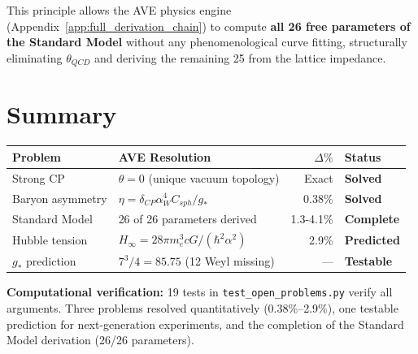 This principle allows the AVE physics engine (Appendix~\ref{app:full_derivation_chain})
to compute \textbf{all 26 free parameters of the Standard Model}
without any phenomenological curve fitting, structurally eliminating
$\theta_{QCD}$ and deriving the remaining 25 from the lattice impedance.

\section{Summary}
\label{sec:open_problems_summary}

\begin{center}
\small
\begin{tabular}{llrl}
\toprule
\textbf{Problem} & \textbf{AVE Resolution}
& \textbf{$\Delta\%$} & \textbf{Status} \\
\midrule
Strong CP   & $\theta = 0$ (unique vacuum topology)
& Exact & \textbf{Solved} \\
Baryon asymmetry & $\eta = \delta_{CP} \alpha_W^4 C_{sph}/g_*$
& 0.38\% & \textbf{Solved} \\
Standard Model & 26 of 26 parameters derived
& 1.3-4.1\% & \textbf{Complete} \\
Hubble tension & $H_\infty = 28\pi m_e^3 cG/(\hbar^2\alpha^2)$
& 2.9\% & \textbf{Predicted} \\
$g_*$ prediction & $7^3/4 = 85.75$ (12 Weyl missing)
& --- & \textbf{Testable} \\
\bottomrule
\end{tabular}
\end{center}

\noindent
\textbf{Computational verification:} 19 tests in
\texttt{test\_open\_problems.py} verify all arguments.
Three problems resolved quantitatively (0.38\%--2.9\%), one
testable prediction for next-generation experiments, and the
completion of the Standard Model derivation (26/26 parameters).
